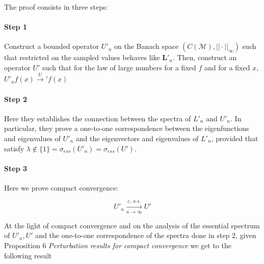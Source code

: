 The proof consists in three steps:
\paragraph{Step 1} Construct a bounded operator $U'_n$ on the Banach space $(C(\mathcal M), ||\cdot||_\infty)$ such that restricted on the sampled values behaves like $\mathbf{L}'_n$. Then, construct an operator $U'$ such that for the law of large numbers for a fixed $f$ and for a fixed $x$, $U'_nf(x) \xrightarrow U'f(x) $
\paragraph{Step 2} Here they establishes the connection between the spectra of $L'_n$ and $U'_n$. In particular, they prove a one-to-one correspondence between the eigenfunctions and eigenvalues of $U'_n$ and the eigenvectors and eigenvalues of $L'_n$, provided that satisfy $\lambda\notin \{1\}=\sigma_{ess}(U'_n)= \sigma_{ess}(U')$.
\paragraph{Step 3} Here we prove compact convergence:

$$U'_n \xrightarrow[n\to\infty]{c,\ a.s.}U'$$

At the light of compact convergence and on the analysis of the essential spectrum of $U'_n, U'$ and the one-to-one correspondence of the spectra done in step 2, given Proposition 6 \textit{Perturbation results for compact convergence} we get to the following result

